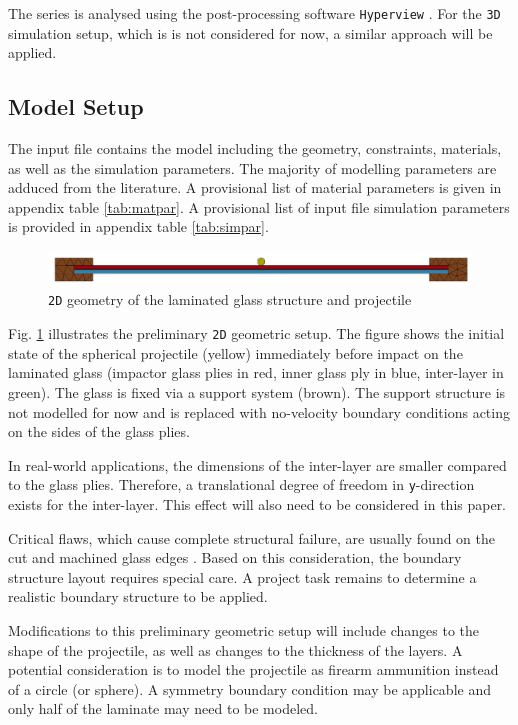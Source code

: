 \documentclass[format=acmtog,12pt,screen=true,review=false,natbib=false,]{acmart}
\begin{document}
\bigbreak
The series is analysed using the post-processing software \texttt{Hyperview} \cite{Hyp17}. For the \texttt{3D} simulation setup, which is is not considered for now, a similar approach will be applied.

\subsection{Model Setup}
\label{subsec:ModelSetup}

The input file contains the model including the geometry, constraints, materials, as well as the simulation parameters. The majority of modelling parameters are adduced from the literature. A provisional list of material parameters is given in appendix table \ref{tab:matpar}. A provisional list of input file simulation parameters is provided in appendix table \ref{tab:simpar}.

\begin{figure}[h!]
    \centering
    \includegraphics[width=\columnwidth]{Geometry}
    \caption{\texttt{2D} geometry of the laminated glass structure and projectile \cite{Che18}}
    \label{fig:geometry}
\end{figure}

Fig. \ref{fig:geometry} illustrates the preliminary \texttt{2D} geometric setup. The figure shows the initial state of the spherical projectile (yellow) immediately before impact on the laminated glass (impactor glass plies in red, inner glass ply in blue, inter-layer in green). The glass is fixed via a support system (brown). The support structure is not modelled for now and is replaced with no-velocity boundary conditions acting on the sides of the glass plies. 

\bigbreak
In real-world applications, the dimensions of the inter-layer are smaller compared to the glass plies. Therefore, a translational degree of freedom in \texttt{y}-direction exists for the inter-layer. This effect will also need to be considered in this paper.

\bigbreak
Critical flaws, which cause complete structural failure, are usually found on the cut and machined glass edges \cite{Pel16}. Based on this consideration, the boundary structure layout requires special care. A project task remains to determine a realistic boundary structure to be applied.

\bigbreak
Modifications to this preliminary geometric setup will include changes to the shape of the projectile, as well as changes to the thickness of the layers. A potential consideration is to model the projectile as firearm ammunition instead of a circle (or sphere). A symmetry boundary condition may be applicable and only half of the laminate may need to be modeled.
\end{document}
